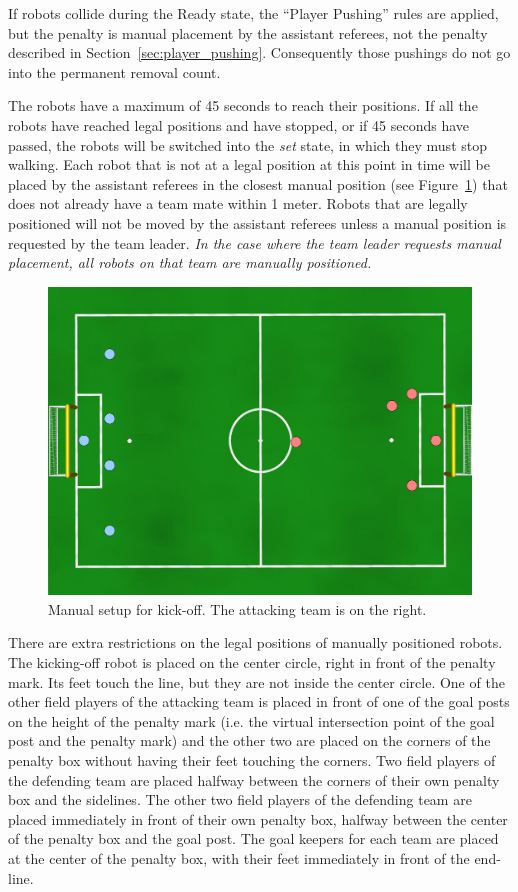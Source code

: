 \documentclass[12pt]{article}
\newcommand{\KickOffAutoTime}{45 seconds\xspace}
\begin{document}
If robots collide during the Ready state, the ``Player Pushing'' rules are applied, but the penalty is manual placement by the assistant referees, not the penalty described in Section~\ref{sec:player_pushing}.
Consequently those pushings do not go into the permanent removal count.

The robots have a maximum of \KickOffAutoTime to reach their positions. If all the robots have reached legal positions and have stopped, or if \KickOffAutoTime have passed, the robots will be switched into the \emph{set} state, in which they must stop walking. Each robot that is not at a legal position at this point in time will be placed by the assistant referees in the closest manual position (see Figure~\ref{fig:ko}) that does not already have a team mate within 1 meter.
Robots that are legally positioned will not be moved by the assistant referees unless a manual position is requested by the team leader.
\emph{In the case where the team leader requests manual placement, all robots on that team are manually positioned.}


\begin{figure}[t]
\centerline{\includegraphics[width=\columnwidth]{figs/manual_placement_2014.pdf}}
\caption{Manual setup for kick-off.  The attacking team is on the right.}
\label{fig:ko}
\end{figure}

There are extra restrictions on the legal positions of manually positioned robots. The kicking-off robot is placed on the center circle, right in front of the penalty mark. Its feet touch the line, but they are not inside the center circle. 
One of the other field players of the attacking team is placed in front of one of the goal posts on the height of the penalty mark (i.e. the virtual intersection point of the goal post and the penalty mark) and the other two are placed on the corners of the penalty box without having their feet touching the corners. 
Two field players of the defending team are placed halfway between the corners of their own penalty box and the sidelines. The other two field players of the defending team are placed immediately in front of their own penalty box, halfway between the center of the penalty box and the goal post.  The goal keepers for each team are placed at the center of the penalty box, with their feet immediately in front of the end-line.
\end{document}
